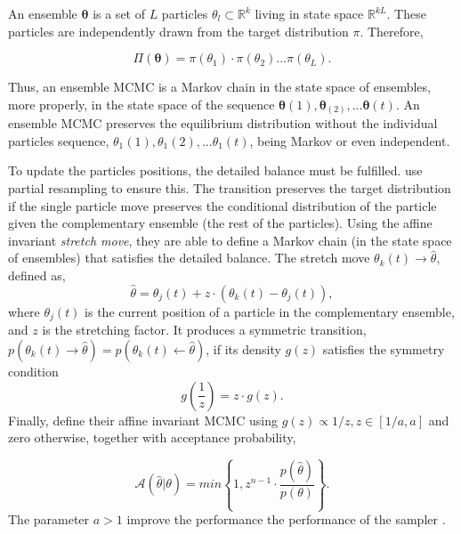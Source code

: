 An ensemble $\boldsymbol{\theta}$ is a set of $L$ particles $\theta_l \subset \mathbb{R}^k$ living in state space $\mathbb{R}^{kL}$. These particles are independently drawn from the target distribution $\pi$. Therefore,

\begin{equation}
\Pi(\boldsymbol{\theta})=\pi(\theta_1)\cdot\pi(\theta_2)...\pi(\theta_L).\nonumber 
\end{equation}

Thus, an ensemble MCMC is a Markov chain in the state space of ensembles, more properly, in the state space of the sequence $\boldsymbol{\theta}(1),\boldsymbol{\theta}_(2),...\boldsymbol{\theta}(t)$. An ensemble MCMC preserves the equilibrium distribution without the individual particles sequence, $\theta_1(1),\theta_1(2),...\theta_1(t)$, being Markov or even independent.

To update the particles positions, the detailed balance must be fulfilled. \citet{Goodman2010} use partial resampling to ensure this. The transition preserves the target distribution if the single particle move preserves the conditional distribution of the particle given the complementary ensemble (the rest of the particles). Using the affine invariant \emph{stretch move}, they are able to define a Markov chain (in the state space of ensembles) that satisfies the detailed balance. The stretch move $\theta_k(t) \rightarrow \hat{\theta}$, defined as,
\begin{equation}
\label{eq:stretchmove}
\hat{\theta}= \theta_j(t) + z\cdot(\theta_k(t)-\theta_j(t)),\nonumber 
\end{equation}
where $\theta_j(t)$ is the current position of a particle in the complementary ensemble, and $z$ is the stretching factor. It produces a symmetric transition, $p(\theta_k(t) \rightarrow \hat{\theta})=p(\theta_k(t) \leftarrow \hat{\theta})$, if its density $g(z)$ satisfies the symmetry condition
\begin{equation}
g(\frac{1}{z})= z\cdot g(z).\nonumber 
\end{equation}
Finally, \citet{Goodman2010} define their affine invariant MCMC using $g(z) \propto 1/z, z\in[1/a,a]$ and zero otherwise, together with acceptance probability,

\begin{equation}
\mathcal{A}(\hat{\theta}|\theta)=min\left\{1,z^{n-1}\cdot \frac{p(\hat{\theta})}{p(\theta)}\right\}.
\end{equation}
The parameter $a>1$ improve the performance the performance of the sampler  \citep{Goodman2010}.

